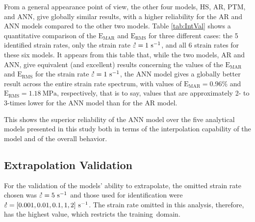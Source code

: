 \documentclass[metals,article,accept,pdftex,moreauthors]{Definitions/mdpi}
\DeclareRobustCommand{\mdot}[1]{\accentset{\mbox{\bfseries .}}{#1}}
\DeclareRobustCommand{\RMSE}{\text{E}_\text{RMS}}
\DeclareRobustCommand{\MARE}{\text{E}_\text{MAR}}
\DeclareRobustCommand{\ps}{\text{s}^{-1}}
\DeclareRobustCommand{\MPa}{\text{MPa}}
\begin{document}
From a general appearance point of view, the other four models, HS, AR, PTM, and ANN, give globally similar results, with a higher reliability for the AR and ANN models compared to the other two models.
Table \ref{tab:IntVal} shows a quantitative comparison of the $\MARE$ and $\RMSE$ for three different cases: the 5 identified strain rates, only the strain rate $\mdot\varepsilon=1~\ps$, and all 6 strain rates for these six models.
It appears from this table that, while the two models, AR and ANN, give equivalent (and excellent) results concerning the values of the $\MARE$ and $\RMSE$ for the strain rate $\mdot\varepsilon=1~\ps$, the ANN model gives a globally better result across the entire strain rate spectrum, with values of $\MARE=0.96\%$ and $\RMSE=1.18~\MPa$, respectively, that is to say, values that are approximately 2- to 3-times lower for the ANN model than for the AR model.

This shows the superior reliability of the ANN model over the five analytical models presented in this study both in terms of the interpolation capability of the model and of the overall behavior.

\subsection{Extrapolation Validation}

For the validation of the models' ability to extrapolate, the omitted strain rate chosen was $\mdot\varepsilon=5~\ps$ and those used for identification were $\mdot\varepsilon=[0.001, 0.01, 0.1, 1, 2]~\ps$.
The strain rate omitted in this analysis, therefore, has the highest value, which restricts the training~domain.
\end{document}

